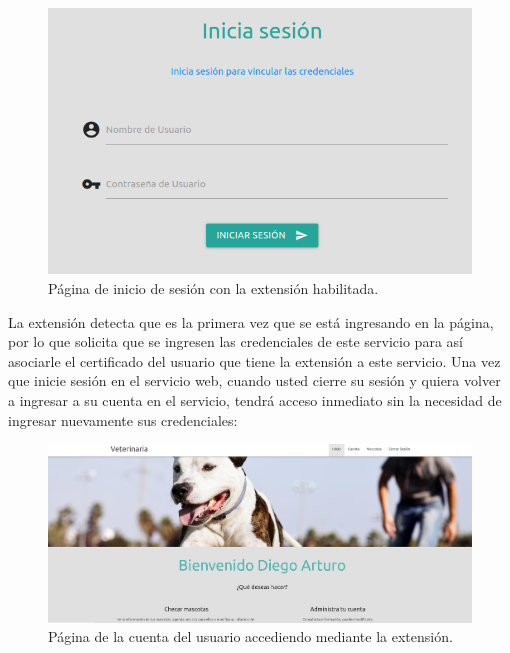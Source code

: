 \documentclass[12pt, a4paper, titlepage]{report}
\begin{document}
	\begin{figure}[H]
		\begin{center}	
		\includegraphics[width=12cm]{./imagenes/Ejecucion/UI_iniciarSesionChaffing.png}
		\caption{Página de inicio de sesión con la extensión habilitada.}
		\label{fig:iniciarSesionChaffing}
		\end{center}
	\end{figure}
    
    La extensión detecta que es la primera vez que se está ingresando en la página, por lo que solicita que se ingresen las credenciales de este servicio para así asociarle el certificado del usuario que tiene la extensión a este servicio. Una vez que inicie sesión en el servicio web, cuando usted cierre su sesión y quiera volver a ingresar a su cuenta en el servicio, tendrá acceso inmediato sin la necesidad de ingresar nuevamente sus credenciales:
    
    \begin{figure}[H]
		\begin{center}	
		\includegraphics[width=12cm]{./imagenes/Ejecucion/UI_homeUsuario.png}
		\caption{Página de la cuenta del usuario accediendo mediante la extensión.}
		\label{fig:homeUsuario}
		\end{center}
	\end{figure}
	
\end{document}
